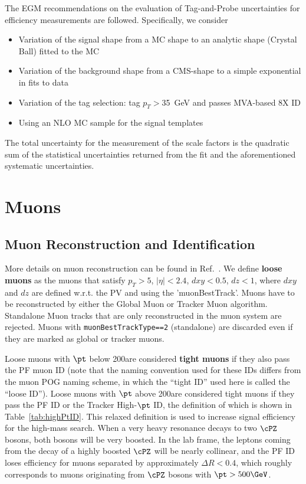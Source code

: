  The EGM recommendations on the evaluation of Tag-and-Probe uncertainties for efficiency measurements are followed. Specifically, we consider

\begin{itemize}
   \item Variation of the signal shape from a MC shape to an analytic shape (Crystal Ball) fitted to the MC
   \item Variation of the background shape from a CMS-shape to a simple exponential in fits to data
   \item Variation of the tag selection: tag $p_{T}>$35~GeV and passes MVA-based 8X ID
   \item Using an NLO MC sample for the signal templates
\end{itemize}

The total uncertainty for the measurement of the scale factors is the quadratic sum of the statistical uncertainties returned from the fit and the aforementioned systematic uncertainties.


\section{Muons}

\subsection{Muon Reconstruction and Identification}
\label{sec:muonReco}

More details on muon reconstruction can be found in Ref.~\cite{AN-15-277}.
We define {\bf loose muons} as the muons that satisfy  
$p_T > 5$, $|\eta| < 2.4$, $dxy< 0.5$, $dz < 1$, where $dxy$ and $dz$ are 
defined w.r.t. the PV and using the 'muonBestTrack'. Muons have to be 
reconstructed by either the Global Muon or Tracker Muon algorithm. Standalone 
Muon tracks that are only reconstructed in the muon system are rejected.
Muons with \verb|muonBestTrackType==2| (standalone) are discarded even if they 
are marked as global or tracker muons. 

Loose muons with $\pt$ below 200\GeV are considered {\bf tight muons} if they 
also pass the PF muon ID (note that the naming 
convention used for these IDs differs from the muon POG naming scheme, in which
the ``tight ID'' used here is called the ``loose ID''). Loose muons with $\pt$ 
above 200\GeV are considered tight muons if they pass the PF ID or the Tracker
High-$\pt$ ID, the definition of which is shown in Table~\ref{tab:highPtID}.
This relaxed definition is used to increase signal efficiency for the high-mass
search. When a very heavy resonance decays to two $\cPZ$ bosons, both bosons
will be very boosted. In the lab frame, the leptons coming from the decay of
a highly boosted $\cPZ$ will be nearly collinear, and the PF ID loses 
efficiency for muons separated by approximately $\Delta R < 0.4$, which roughly 
corresponds to muons originating from $\cPZ$ bosons with $\pt > 500\GeV$.

